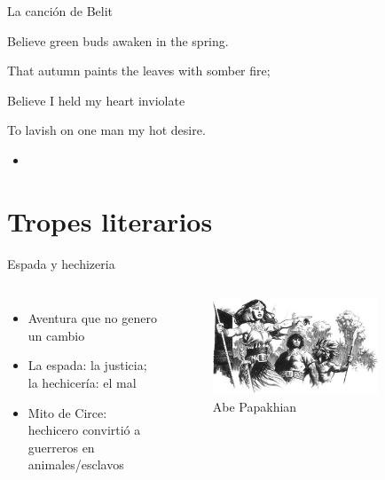 \begin{frame}{La canción de Belit}
	\begin{exampleblock}{}
		Believe green buds awaken in the spring.

		That autumn paints the leaves with somber fire;

		Believe I held my heart inviolate

		To lavish on one man my hot desire.
	\end{exampleblock}

	\begin{itemize}
		\item \textit{  }
	\end{itemize}
\end{frame}
\note[itemize]{
	\item
}

\section{Tropes literarios}
\note[itemize]{
	\item
}

\begin{frame}{Espada y hechizeria}
	\begin{columns}
		\begin{itemize}
			\item Aventura que no genero un cambio
			\item La espada: la justicia; la hechicería: el mal
			\item Mito de Circe: hechicero convirtió a guerreros en animales/esclavos
		\end{itemize}
		\begin{figure}[htb]
			\centering
			\includegraphics[width=0.8\textwidth]{img/tributos/elephant07}
			\caption{Abe Papakhian}
		\end{figure}
	\end{columns}
\end{frame}
\note[itemize]{
	\item
}

